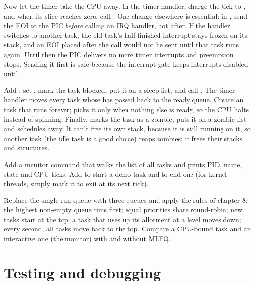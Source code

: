 \documentclass[11pt,a4paper]{article}
\begin{document}
Now let the timer take the CPU away. In the timer handler, charge the tick to , and when its slice
reaches zero, call . One change elsewhere is essential: in , send the EOI to the PIC
\emph{before} calling an IRQ handler, not after. If the handler switches to another task, the old task's half-finished
interrupt stays frozen on its stack, and an EOI placed after the call would not be sent until that task runs again.
Until then the PIC delivers no more timer interrupts and preemption stops. Sending it first is safe because the
interrupt gate keeps interrupts disabled until .

Add : set , mark the task blocked, put it on a sleep list, and call .
The timer handler moves every task whose  has passed back to the ready queue. Create an 
task that runs  forever;  picks it only when nothing else is ready, so the CPU halts
instead of spinning. Finally,  marks the task as a zombie, puts it on a zombie list and schedules
away. It can't free its own stack, because it is still running on it, so another task (the idle task is a good
choice) reaps zombies: it frees their stacks and structures.

Add a  monitor command that walks the list of all tasks and prints PID, name, state and CPU ticks. Add
 to start a demo task and  to end one (for kernel threads, simply mark it to exit
at its next tick).

Replace the single run queue with three queues and apply the rules of \OSTEP chapter 8: the highest non-empty queue
runs first; equal priorities share round-robin; new tasks start at the top; a task that uses up its allotment at a
level moves down; every second, all tasks move back to the top. Compare a CPU-bound task and an interactive one (the
monitor) with and without MLFQ.

\section{Testing and debugging}
\end{document}
